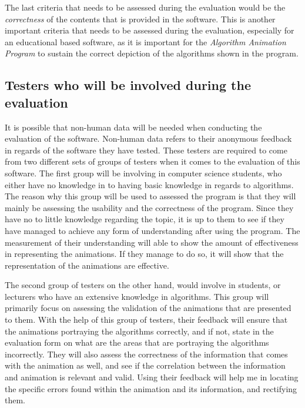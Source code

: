 The last criteria that needs to be assessed during the evaluation would be the \textit{correctness} of the contents that is provided in the software. This is another important criteria that needs to be assessed during the evaluation, especially for an educational based software, as it is important for the \textit{Algorithm Animation Program} to sustain the correct depiction of the algorithms shown in the program. 

\subsection{Testers who will be involved during the evaluation}
It is possible that non-human data will be needed when conducting the evaluation of the software. Non-human data refers to their anonymous feedback in regards of the software they have tested. These testers are required to come from two different sets of groups of testers when it comes to the evaluation of this software. The first group will be involving in computer science students, who either have no knowledge in to having basic knowledge in regards to algorithms. The reason why this group will be used to assessed the program is that they will mainly be assessing the usability and the correctness of the program. Since they have no to little knowledge regarding the topic, it is up to them to see if they have managed to achieve any form of understanding after using the program. The measurement of their understanding will able to show the amount of effectiveness in representing the animations. If they manage to do so, it will show that the representation of the animations are effective.

The second group of testers on the other hand, would involve in students, or lecturers who have an extensive knowledge in algorithms. This group will primarily focus on assessing the validation of the animations that are presented to them. With the help of this group of testers, their feedback will ensure that the animations portraying the algorithms correctly, and if not, state in the evaluation form on what are the areas that are portraying the algorithms incorrectly. They will also assess the correctness of the information that comes with the animation as well, and see if the correlation between the information and animation is relevant and valid. Using their feedback will help me in locating the specific errors found within the animation and its information, and rectifying them.

